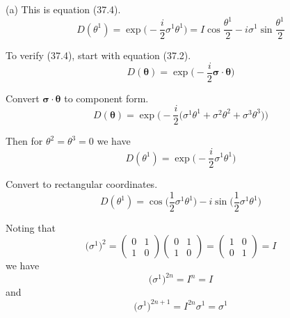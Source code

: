 


\bigskip
(a) This is equation (37.4).
\begin{equation*}
D(\theta^1)=\exp\bigg({-}\frac{i}{2}\sigma^1\theta^1\bigg)
=I\cos\frac{\theta^1}{2}-i\sigma^1\sin\frac{\theta^1}{2}
\tag{37.4}
\end{equation*}

To verify (37.4), start with equation (37.2).
\begin{equation*}
D(\boldsymbol\theta)=\exp\bigg({-}\frac{i}{2}\boldsymbol\sigma\cdot\boldsymbol\theta\bigg)
\tag{37.2}
\end{equation*}

Convert $\boldsymbol\sigma\cdot\boldsymbol\theta$ to component form.
\begin{equation*}
D(\boldsymbol\theta)=\exp\bigg({-}\frac{i}{2}\big(\sigma^1\theta^1+\sigma^2\theta^2+\sigma^3\theta^3\big)\bigg)
\end{equation*}

Then for $\theta^2=\theta^3=0$ we have
\begin{equation*}
D(\theta^1)=\exp\bigg({-}\frac{i}{2}\sigma^1\theta^1\bigg)
\end{equation*}

Convert to rectangular coordinates.
\begin{equation*}
D(\theta^1)=\cos\bigg(\frac{1}{2}\sigma^1\theta^1\bigg)-i\sin\bigg(\frac{1}{2}\sigma^1\theta^1\bigg)
\tag{1}
\end{equation*}

Noting that
\begin{equation*}
\big(\sigma^1\big)^2=\begin{pmatrix}0&1\\1&0\end{pmatrix}\begin{pmatrix}0&1\\1&0\end{pmatrix}
=\begin{pmatrix}1&0\\0&1\end{pmatrix}=I
\end{equation*}
we have
\begin{equation*}
\big(\sigma^1\big)^{2n}=I^n=I
\end{equation*}
and
\begin{equation*}
\big(\sigma^1\big)^{2n+1}=I^{2n}\sigma^1=\sigma^1
\end{equation*}

